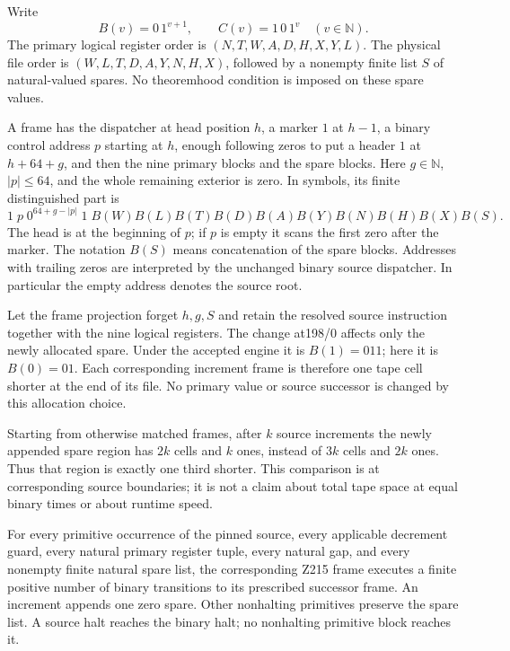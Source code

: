 Write
\[
 B(v)=0\,1^{v+1},\qquad C(v)=1\,0\,1^v \quad(v\in\mathbb N).
\]
The primary logical register order is
$(N,T,W,A,D,H,X,Y,L)$.  The physical file order is
$(W,L,T,D,A,Y,N,H,X)$, followed by a nonempty finite list $S$ of natural-valued
spares.  No theoremhood condition is imposed on these spare values.

A frame has the dispatcher at head position $h$, a marker $1$ at $h-1$, a
binary control address $p$ starting at $h$, enough following zeros to put a
header $1$ at $h+64+g$, and then the nine primary blocks and the spare blocks.
Here $g\in\mathbb N$, $|p|\leq64$, and the whole remaining exterior is zero.
In symbols, its finite distinguished part is
\[
 1\;p\;0^{64+g-|p|}\;1\;
 B(W)B(L)B(T)B(D)B(A)B(Y)B(N)B(H)B(X)B(S).
\]
The head is at the beginning of $p$; if $p$ is empty it scans the first zero
after the marker.  The notation $B(S)$ means concatenation of the spare
blocks.  Addresses with trailing zeros are interpreted by the unchanged
binary source dispatcher.  In particular the empty address denotes the
source root.

Let the frame projection forget $h,g,S$ and retain the resolved source
instruction together with the nine logical registers.  The change at198/0
affects only the newly allocated spare.  Under the accepted engine it is
$B(1)=011$; here it is $B(0)=01$.  Each corresponding increment frame is
therefore one tape cell shorter at the end of its file.  No primary value or
source successor is changed by this allocation choice.

Starting from otherwise matched frames, after $k$ source increments the
newly appended spare region has $2k$ cells and $k$ ones, instead of
$3k$ cells and $2k$ ones. Thus that region is exactly one third shorter.
This comparison is at corresponding source boundaries; it is not a claim
about total tape space at equal binary times or about runtime speed.

\begin{lemma}
\label{lem:z215-primitive}
For every primitive occurrence of the pinned source, every applicable
decrement guard, every natural primary register tuple, every natural gap,
and every nonempty finite natural spare list, the corresponding Z215 frame
executes a finite positive number of binary transitions to its prescribed
successor frame.  An increment appends one zero spare.  Other nonhalting
primitives preserve the spare list.  A source halt reaches the binary halt;
no nonhalting primitive block reaches it.
\end{lemma}

